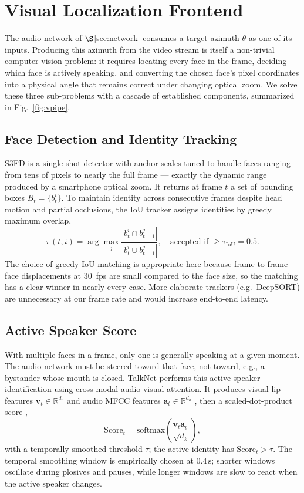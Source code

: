 \documentclass[journal,10pt]{IEEEtran}
\newcommand{\R}{\mathbb{R}}
\newcommand{\bv}{\mathbf{v}}
\newcommand{\ba}{\mathbf{a}}
\newcommand{\softmax}{\mathrm{softmax}}
\begin{document}
\section{Visual Localization Frontend}
\label{sec:vlf}
The audio network of \(\S\)\ref{sec:network} consumes a target azimuth \(\theta\) as one of its inputs. Producing this azimuth from the video stream is itself a non-trivial computer-vision problem: it requires locating every face in the frame, deciding which face is actively speaking, and converting the chosen face's pixel coordinates into a physical angle that remains correct under changing optical zoom. We solve these three sub-problems with a cascade of established components, summarized in Fig.~\ref{fig:vpipe}.

\subsection{Face Detection and Identity Tracking}
S3FD \cite{s3fd} is a single-shot detector with anchor scales tuned to handle faces ranging from tens of pixels to nearly the full frame --- exactly the dynamic range produced by a smartphone optical zoom. It returns at frame \(t\) a set of bounding boxes \(B_t=\{b_t^i\}\). To maintain identity across consecutive frames despite head motion and partial occlusions, the IoU tracker \cite{iou_tracker} assigns identities by greedy maximum overlap,
\begin{equation}
\pi(t,i)=\arg\!\max_{j}\frac{|b_t^i\cap b_{t-1}^j|}{|b_t^i\cup b_{t-1}^j|},\quad\text{accepted if }\ge\tau_{\mathrm{IoU}}=0.5.
\end{equation}
The choice of greedy IoU matching is appropriate here because frame-to-frame face displacements at 30~fps are small compared to the face size, so the matching has a clear winner in nearly every case. More elaborate trackers (e.g.\ DeepSORT) are unnecessary at our frame rate and would increase end-to-end latency.

\subsection{Active Speaker Score}
With multiple faces in a frame, only one is generally speaking at a given moment. The audio network must be steered toward that face, not toward, e.g., a bystander whose mouth is closed. TalkNet \cite{talknet} performs this active-speaker identification using cross-modal audio-visual attention. It produces visual lip features \(\bv_t\!\in\!\R^{d_v}\) and audio MFCC features \(\ba_t\!\in\!\R^{d_a}\) \cite{mfcc}, then a scaled-dot-product score \cite{attention_is_all_you_need},
\begin{equation}
\mathrm{Score}_t=\softmax\!\left(\frac{\bv_t\ba_t^\top}{\sqrt{d_k}}\right),
\label{eq:talknet}
\end{equation}
with a temporally smoothed threshold \(\tau\); the active identity has \(\mathrm{Score}_t>\tau\). The temporal smoothing window is empirically chosen at \(0.4\,\mathrm{s}\); shorter windows oscillate during plosives and pauses, while longer windows are slow to react when the active speaker changes.
\end{document}
